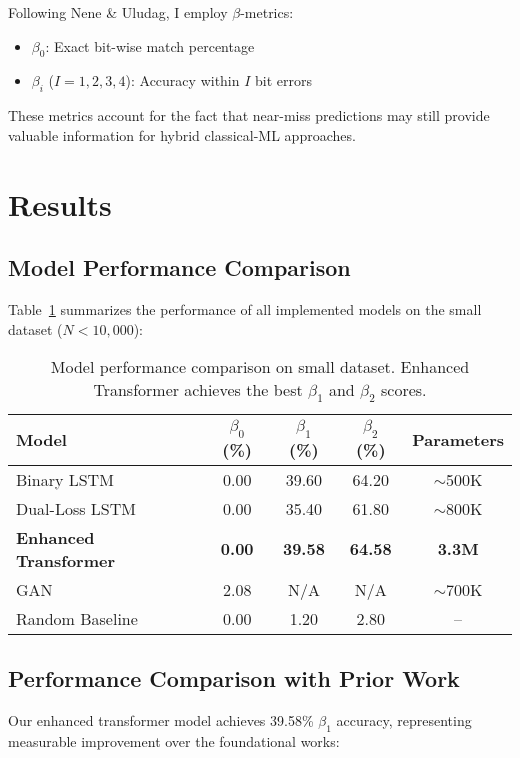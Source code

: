 \documentclass[12pt]{article}
\begin{document}
Following Nene \& Uludag, I employ $\beta$-metrics:
\begin{itemize}
\item $\beta_0$: Exact bit-wise match percentage
\item $\beta_i$ ($I = 1,2,3,4$): Accuracy within $I$ bit errors
\end{itemize}

These metrics account for the fact that near-miss predictions may still provide valuable information for hybrid classical-ML approaches.

\section{Results}

\subsection{Model Performance Comparison}

Table~\ref{tab:results} summarizes the performance of all implemented models on the small dataset ($N < 10,000$):

\begin{table}[h]
\centering
\begin{tabular}{@{}lcccc@{}}
\toprule
Model & $\beta_0$ (\%) & $\beta_1$ (\%) & $\beta_2$ (\%) & Parameters \\
\midrule
Binary LSTM & 0.00 & 39.60 & 64.20 & $\sim$500K \\
Dual-Loss LSTM & 0.00 & 35.40 & 61.80 & $\sim$800K \\
\textbf{Enhanced Transformer} & \textbf{0.00} & \textbf{39.58} & \textbf{64.58} & \textbf{3.3M} \\
GAN & 2.08 & N/A & N/A & $\sim$700K \\
Random Baseline & 0.00 & 1.20 & 2.80 & -- \\
\bottomrule
\end{tabular}
\caption{Model performance comparison on small dataset. Enhanced Transformer achieves the best $\beta_1$ and $\beta_2$ scores.}
\label{tab:results}
\end{table}

\subsection{Performance Comparison with Prior Work}

Our enhanced transformer model achieves 39.58\% $\beta_1$ accuracy, representing measurable improvement over the foundational works:
\end{document}
